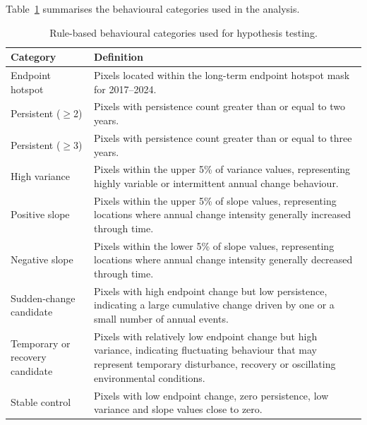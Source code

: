 \documentclass[11pt,a4paper]{article}
\begin{document}
Table~\ref{tab:behaviour_categories} summarises the behavioural categories used in the analysis.

\begin{table}[H]
\centering
\caption{Rule-based behavioural categories used for hypothesis testing.}
\label{tab:behaviour_categories}
\renewcommand{\arraystretch}{1.25}
\begin{tabularx}{\textwidth}{>{\raggedright\arraybackslash}p{3.5cm} X}
\toprule
\textbf{Category} & \textbf{Definition} \\
\midrule

Endpoint hotspot &
Pixels located within the long-term endpoint hotspot mask for 2017--2024. \\

Persistent ($\geq$2) &
Pixels with persistence count greater than or equal to two years. \\

Persistent ($\geq$3) &
Pixels with persistence count greater than or equal to three years. \\

High variance &
Pixels within the upper 5\% of variance values, representing highly variable or intermittent annual change behaviour. \\

Positive slope &
Pixels within the upper 5\% of slope values, representing locations where annual change intensity generally increased through time. \\

Negative slope &
Pixels within the lower 5\% of slope values, representing locations where annual change intensity generally decreased through time. \\

Sudden-change candidate &
Pixels with high endpoint change but low persistence, indicating a large cumulative change driven by one or a small number of annual events. \\

Temporary or recovery candidate &
Pixels with relatively low endpoint change but high variance, indicating fluctuating behaviour that may represent temporary disturbance, recovery or oscillating environmental conditions. \\

Stable control &
Pixels with low endpoint change, zero persistence, low variance and slope values close to zero. \\

\bottomrule
\end{tabularx}
\end{table}
\end{document}
